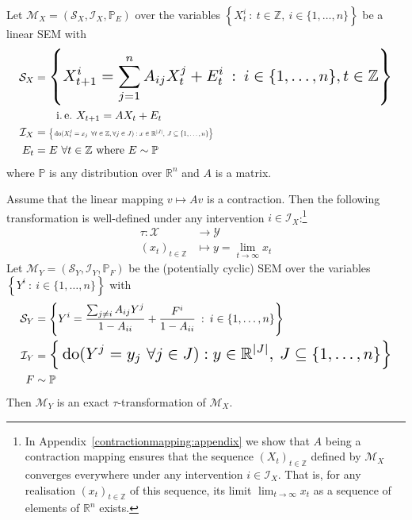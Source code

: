 \begin{theorem}\label{theorem:identical}
Let $\mathcal{M}_X = \left(\mathcal{S}_X, \mathcal{I}_X, \mathbb{P}_{E} \right)$ over the variables ${\left\lbrace X_t^i \: : \: t \in \mathbb{Z}, \: i\in \{1,\ldots,n\} \right\rbrace}$ be a linear SEM with
%
\begin{align*}
\mathcal{S}_X &= \resizebox{.9\linewidth}{!}{$\displaystyle\left\lbrace X_{t+1}^i = \sum_{j=1}^n A_{ij}X_t^j + E_t^i \:  : \: i \in \{1,\ldots,n\}, t\in\mathbb{Z} \right\rbrace$} \\
&\qquad\text{i.\,e.}\ X_{t+1} = AX_t + E_t \\
%
\mathcal{I}_X &= \resizebox{0.43\textwidth}{!}{$\Big{\{} \doop(X_t^j= x_j \enspace \forall t \in \mathbb{Z},\forall j \in J):  x \in \mathbb{R}^{|J|}, \: J \subseteq \{1,\ldots,n\} \Big{\}} $}\\
%
E_t &= E\ \forall t\in\mathbb{Z} \text{ where } E \sim \mathbb{P}
\end{align*}
%
where $\mathbb{P}$ is any distribution over $\mathbb{R}^n$ and $A$ is a matrix.

Assume that the linear mapping $v\mapsto Av$ is a contraction.
Then the following transformation is well-defined under any intervention $i\in\mathcal{I}_X$:\footnote{In Appendix~\ref{contractionmapping:appendix} we show that $A$ being a contraction mapping ensures that the sequence $(X_t)_{t\in\mathbb{Z}}$ defined by $\mathcal{M}_X$ converges everywhere under any intervention $i\in\mathcal{I}_X$. That is, for any realisation $(x_t)_{t\in\mathbb{Z}}$ of this sequence, its limit $\lim_{t\rightarrow \infty}x_t$ as a sequence of elements of $\mathbb{R}^n$ exists.}
%
\begin{align*}
\tau : \mathcal{X} &\rightarrow \mathcal{Y} \\
(x_t)_{t\in \mathbb{Z}} & \mapsto y= \lim_{t\rightarrow \infty} x_t
\end{align*}
%
Let ${\mathcal{M}_Y = \left(\mathcal{S}_Y, \mathcal{I}_Y, \mathbb{P}_{F} \right)}$ be the (potentially cyclic) SEM over the variables ${\left\lbrace Y^i \: :  \: i\in \{1,\ldots,n\} \right\rbrace}$  with
%
\begin{align*}
\mathcal{S}_Y &= \left\lbrace Y^i = \frac{\sum_{j\not=i} A_{ij}Y^j}{1-A_{ii}} + \frac{F^i}{1-A_{ii}} \:  : \: i \in \{1,\ldots,n\} \right\rbrace \\
%
\mathcal{I}_Y &= \resizebox{.9\linewidth}{!}{$\displaystyle\Big{\{} \doop(Y^j= y_j \ \forall j \in J) : y \in \mathbb{R}^{|J|}, \: J \subseteq \{1,\ldots,n\} \Big{\}}$} \\
%
F &\sim \mathbb{P}
\end{align*}
%
Then $\mathcal{M}_Y$ is an exact $\tau$-transformation of $\mathcal{M}_X$.
\end{theorem}

